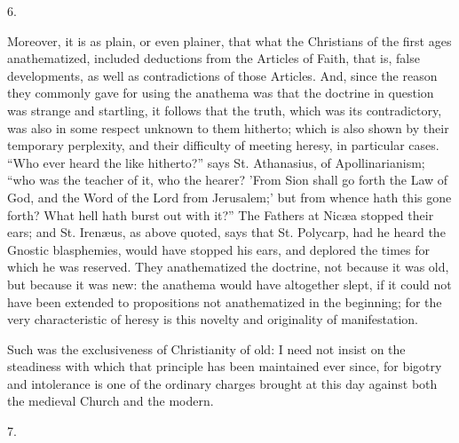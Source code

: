 6.

Moreover, it is as plain, or even plainer, that what the Christians
of the first ages anathematized, included deductions from the Articles
of Faith, that is, false developments, as well as contradictions of
those Articles. And, since the reason they commonly gave for using the
anathema was that the doctrine in question was strange and startling,
it follows that the truth, which was its contradictory, was also in
some respect unknown to them hitherto; which is also shown by their
temporary perplexity, and their difficulty of meeting heresy, in
particular cases. ``Who ever heard the like hitherto?'' says
St. Athanasius, of Apollinarianism; ``who was the teacher of it,
who the hearer? 'From Sion shall go forth the Law of God, and the Word
of the Lord from Jerusalem;' but from whence hath this gone forth?
What hell hath burst out with it?'' The Fathers at Nicæa stopped
their ears; and St. Irenæus, as above quoted, says that St. Polycarp,
had he heard the Gnostic blasphemies, would have stopped his ears, and
deplored the times for which he was reserved. They anathematized the
doctrine, not because it was old, but because it was new: the anathema
would have altogether slept, if it could not have been extended to
propositions not anathematized in the beginning; for the very
characteristic of heresy is this novelty and originality of
manifestation.

Such was the exclusiveness of Christianity of old: I need not
insist on the steadiness with which that principle has been maintained
ever since, for bigotry and intolerance is one of the ordinary charges
brought at this day against both the medieval Church and the modern.

7.

